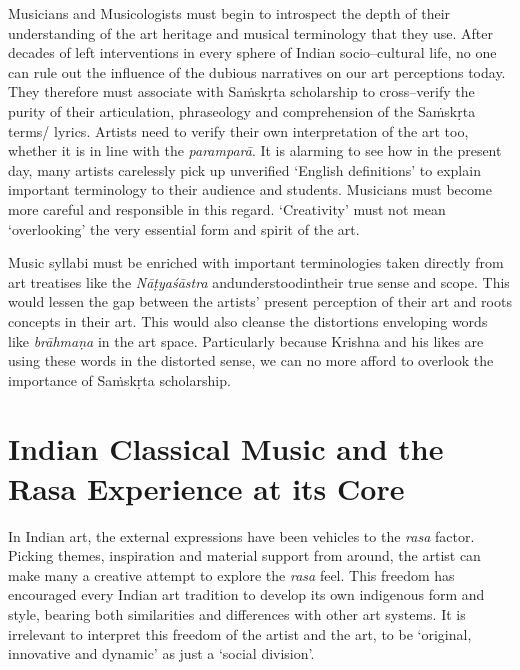 Musicians and Musicologists must begin to introspect the depth of their understanding of the art heritage and musical terminology that they use. After decades of left interventions in every sphere of Indian socio–cultural life, no one can rule out the influence of the dubious narratives on our art perceptions today. They therefore must associate with Saṁskṛta scholarship to cross–verify the purity of their articulation, phraseology and comprehension of the Saṁskṛta terms/ lyrics. Artists need to verify their own interpretation of the art too, whether it is in line with the \textit{paramparā}. It is alarming to see how in the present day, many artists carelessly pick up unverified ‘English definitions’ to explain important terminology to their audience and students. Musicians must become more careful and responsible in this regard. ‘Creativity’ must not mean ‘overlooking’ the very essential form and spirit of the art.

Music syllabi must be enriched with important terminologies taken directly from art treatises like the \textit{Nāṭyaśāstra} andunderstoodintheir true sense and scope. This would lessen the gap between the artists’ present perception of their art and roots concepts in their art. This would also cleanse the distortions enveloping words like \textit{brāhmaṇa} in the art space. Particularly because Krishna and his likes are using these words in the distorted sense, we can no more afford to overlook the importance of Saṁskṛta scholarship.

\vspace{-.3cm}

\section*{Indian Classical Music and the Rasa Experience at its Core}

In Indian art, the external expressions have been vehicles to the \textit{rasa} factor. Picking themes, inspiration and material support from around, the artist can make many a creative attempt to explore the \textit{rasa} feel. This freedom has encouraged every Indian art tradition to develop its own indigenous form and style, bearing both similarities and differences with other art systems. It is irrelevant to interpret this freedom of the artist and the art, to be ‘original, innovative and dynamic’ as just a ‘social division’.

